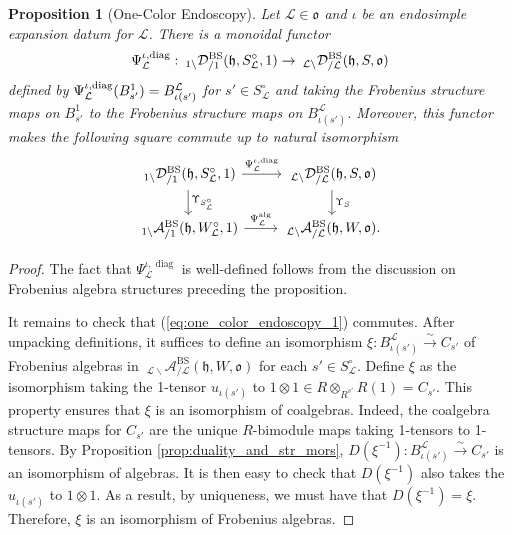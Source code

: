 \documentclass{amsart}
\newcommand{\scrL}{\mathcal{L}}
\newcommand{\fr}[1]{\mathfrak{#1}}
\DeclareMathOperator{\diag}{diag}
\DeclareMathOperator{\BS}{BS}
\newcommand{\EWmon}[2]{\:_{#1 \backslash} \mathcal{D}_{/ #2} }
\newcommand{\Amon}[2]{\:_{#1 \backslash} \mathcal{A}_{/ #2} }
\newtheorem{proposition}[subsubsection]{Proposition}
\theoremstyle{definition}
\numberwithin{equation}{subsection}
\begin{document}
\begin{proposition}[One-Color Endoscopy]\label{prop:one_color_endoscopy}
    Let $\scrL \in \fr{o}$ and $\iota$ be an endosimple expansion datum for $\scrL$.
    There is a monoidal functor
    \[ \Psi_{\scrL}^{\iota, \textnormal{diag}} : \EWmon{1}{1}^{\BS} (\fr{h}, S_{\scrL}^{\circ}, 1) \to \EWmon{\scrL}{\scrL}^{\BS} (\fr{h}, S, \fr{o})\]
    defined by $\Psi_{\scrL}^{\iota, \textnormal{diag}} (B_{s'}^{1}) = B_{\iota (s')}^{\scrL}$ for $s' \in S_{\scrL}^{\circ}$ and taking the Frobenius structure maps on $B_{s'}^1$ to the Frobenius structure maps on $B_{\iota (s')}^{\scrL}$.
    Moreover, this functor makes the following square commute up to natural isomorphism
    \begin{equation}\label{eq:one_color_endoscopy_1}
    \begin{tikzcd}
        {\EWmon{1}{1}^{\BS} (\fr{h}, S_{\scrL}^{\circ}, 1)} \arrow[r, "{\Psi_{\scrL}^{\iota, \textnormal{diag}}}"] \arrow[d, "\Upsilon_{S_{\scrL}^{\circ}}"] & {\EWmon{\scrL}{\scrL}^{\BS} (\fr{h}, S, \fr{o})} \arrow[d, "\Upsilon_S"] \\
        {\Amon{1}{1}^{\BS} (\fr{h}, W_{\scrL}^{\circ}, 1)} \arrow[r, "{\Psi_{\scrL}^{\textnormal{alg}}}"]                                         & {\Amon{\scrL}{\scrL}^{\BS} (\fr{h}, W, \fr{o})}.                     
        \end{tikzcd}
    \end{equation}
\end{proposition}
\begin{proof}
    The fact that $\Psi_{\scrL}^{\iota, \diag}$ is well-defined follows from the discussion on Frobenius algebra structures preceding the proposition.
    
    It remains to check that (\ref{eq:one_color_endoscopy_1}) commutes. 
    After unpacking definitions, it suffices to define an isomorphism $\xi : B_{\iota (s')}^{\scrL} \stackrel{\sim}{\to} C_{s'}$ of Frobenius algebras in $\Amon{\scrL}{\scrL}^{\BS} (\fr{h}, W, \fr{o})$ for each $s' \in S_{\scrL}^{\circ}$.
    Define $\xi$ as the isomorphism taking the 1-tensor $u_{\iota (s')}$ to $1 \otimes 1 \in R \otimes_{R^{s'}} R (1) = C_{s'}$. 
    This property ensures that $\xi$ is an isomorphism of coalgebras. Indeed, the coalgebra structure maps for $C_{s'}$ are the unique $R$-bimodule maps taking 1-tensors to 1-tensors.
    By Proposition \ref{prop:duality_and_str_mors}, $D(\xi^{-1}) :  B_{\iota (s')}^{\scrL} \stackrel{\sim}{\to} C_{s'}$ is an isomorphism of algebras. It is then easy to check that $D(\xi^{-1})$ also takes the $u_{\iota (s')}$ to $1 \otimes 1$.
    As a result, by uniqueness, we must have that $D(\xi^{-1}) = \xi$. Therefore, $\xi$ is an isomorphism of Frobenius algebras.
\end{proof} 
\end{document}
